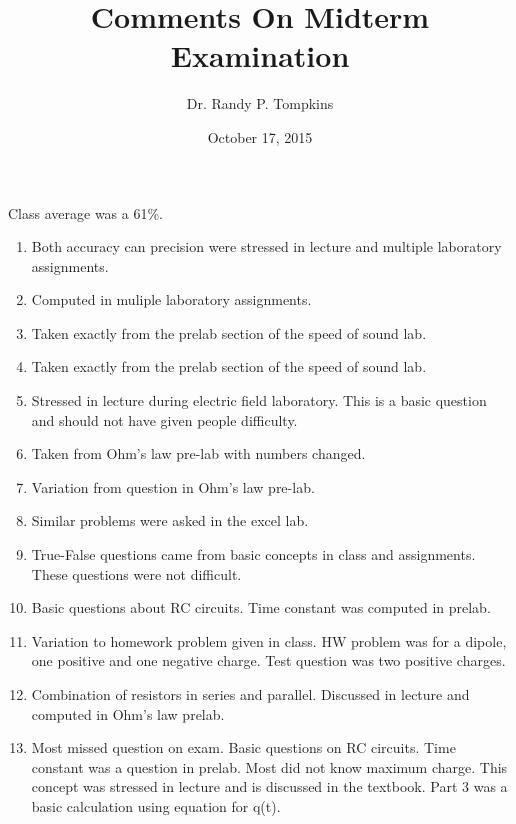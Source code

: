 \documentclass[12pt]{article}
\begin{document}
\title{Comments On Midterm Examination}
\author{Dr. Randy P. Tompkins}
\date{October 17, 2015}

\maketitle

\noindent
Class average was a 61\%.


\begin{enumerate}

\item{Both accuracy can precision were stressed in lecture and multiple laboratory assignments.} 
\item{Computed in muliple laboratory assignments.}
\item{Taken exactly from the prelab section of the speed of sound lab.}
\item{Taken exactly from the prelab section of the speed of sound lab.}
\item{Stressed in lecture during electric field laboratory. This is a basic question and should not have given people difficulty.}
\item{Taken from Ohm's law pre-lab with numbers changed.}
\item{Variation from question in Ohm's law pre-lab.} 
\item{Similar problems were asked in the excel lab.}
\item{True-False questions came from basic concepts in class and assignments. These questions were not difficult.}
\item{Basic questions about RC circuits. Time constant was computed in prelab.}
\item{Variation to homework problem given in class. HW problem was for a dipole, one positive and one negative charge. Test question was two positive charges.}
\item{Combination of resistors in series and parallel. Discussed in lecture and computed in Ohm's law prelab.}
\item{Most missed question on exam. Basic questions on RC circuits. Time constant was a question in prelab. Most did not know maximum charge. This concept was stressed in lecture and is discussed in the textbook. Part 3 was a basic calculation using equation for q(t).}
     
\end{enumerate}
\end{document}
